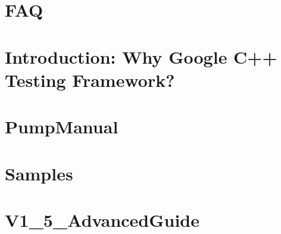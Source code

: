 \documentclass[twoside]{book}
\newcommand{\+}{\discretionary{\mbox{\scriptsize$\hookleftarrow$}}{}{}}
\begin{document}
\chapter{F\+AQ}
\label{md___users_fjp_git_bachelor_bachelor-master_updated_vfinal_googletest-1_88_80_googletest_docs__f_a_q}

\chapter{Introduction\+: Why Google C++ Testing Framework?}
\label{md___users_fjp_git_bachelor_bachelor-master_updated_vfinal_googletest-1_88_80_googletest_docs__primer}

\chapter{Pump\+Manual}
\label{md___users_fjp_git_bachelor_bachelor-master_updated_vfinal_googletest-1_88_80_googletest_docs__pump_manual}

\chapter{Samples}
\label{md___users_fjp_git_bachelor_bachelor-master_updated_vfinal_googletest-1_88_80_googletest_docs__samples}

\chapter{V1\+\_\+5\+\_\+\+Advanced\+Guide}
\label{md___users_fjp_git_bachelor_bachelor-master_updated_vfinal_googletest-1_88_80_googletest_docs__v1_5__advanced_guide}

\end{document}
